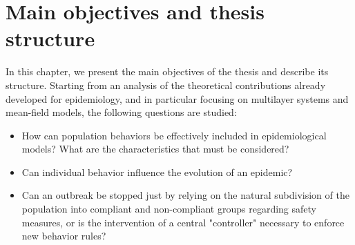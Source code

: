 
\chapter{Main objectives and thesis structure}

In this chapter, we present the main objectives of the thesis and describe its structure. Starting from an analysis of the theoretical contributions already developed for epidemiology, and in particular focusing on multilayer systems and mean-field models, the following questions are studied:

\begin{itemize}
	\item How can population behaviors be effectively included in epidemiological models? What are the characteristics that must be considered?
	\item Can individual behavior influence the evolution of an epidemic?
	\item Can an outbreak be stopped just  by relying on the natural subdivision of the population into compliant and non-compliant groups regarding safety measures, or is the intervention of a central "controller" necessary to enforce new behavior rules?
\end{itemize}



